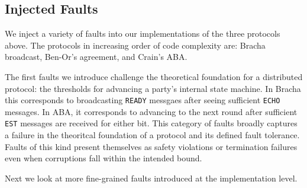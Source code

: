 \subsection{Injected Faults}
We inject a variety of faults into our implementations of the three protocols above.
The protocols in increasing order of code complexity are: Bracha broadcast, Ben-Or's agreement, and Crain's ABA.

The first faults we introduce challenge the theoretical foundation for a distributed protocol: the thresholds for advancing a party's internal state machine. 
In Bracha this corresponds to broadcasting \texttt{READY} messgaes after seeing sufficient \texttt{ECHO} messages.
In ABA, it corresponds to advancing to the next round after sufficient \texttt{EST} messages are received for either bit.
This category of faults broadly captures a failure in the theoritcal foundation of a protocol and its defined fault tolerance. 
Faults of this kind present themselves as safety violations or termination failures even when corruptions fall within the intended bound. 

Next we look at more fine-grained faults introduced at the implementation level.  







